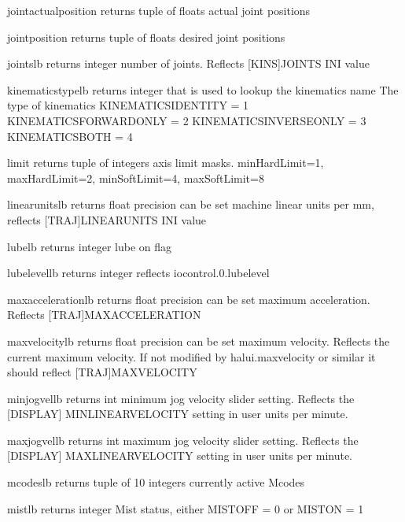 \documentclass[letterpaper,10pt,english]{sphinxmanual}
\begin{document}
\begin{sphinxVerbatim}[commandchars=\\\{\}]
joint\PYGZus{}actual\PYGZus{}position \PYGZhy{} returns tuple of floats
actual joint positions

joint\PYGZus{}position \PYGZhy{} returns tuple of floats
desired joint positions

joints\PYGZus{}lb \PYGZhy{} returns integer
number of joints. Reflects [KINS]JOINTS INI value

kinematics\PYGZus{}type\PYGZus{}lb \PYGZhy{} returns integer that is used to lookup the kinematics name
The type of kinematics
        KINEMATICS\PYGZus{}IDENTITY = 1
        KINEMATICS\PYGZus{}FORWARD\PYGZus{}ONLY = 2
        KINEMATICS\PYGZus{}INVERSE\PYGZus{}ONLY = 3
        KINEMATICS\PYGZus{}BOTH = 4

limit \PYGZhy{} returns tuple of integers
axis limit masks. minHardLimit=1, maxHardLimit=2, minSoftLimit=4, maxSoftLimit=8

linear\PYGZus{}units\PYGZus{}lb \PYGZhy{} returns float \PYGZhy{} precision can be set
machine linear units per mm, reflects [TRAJ]LINEAR\PYGZus{}UNITS INI value

lube\PYGZus{}lb \PYGZhy{} returns integer
lube on flag

lube\PYGZus{}level\PYGZus{}lb \PYGZhy{} returns integer
reflects iocontrol.0.lube\PYGZus{}level

max\PYGZus{}acceleration\PYGZus{}lb \PYGZhy{} returns float \PYGZhy{} precision can be set
maximum acceleration. Reflects [TRAJ]MAX\PYGZus{}ACCELERATION

max\PYGZus{}velocity\PYGZus{}lb \PYGZhy{} returns float \PYGZhy{} precision can be set
maximum velocity. Reflects the current maximum velocity. If not modified by
halui.max\PYGZhy{}velocity or similar it should reflect [TRAJ]MAX\PYGZus{}VELOCITY

min\PYGZus{}jog\PYGZus{}vel\PYGZus{}lb \PYGZhy{} returns int
minimum jog velocity slider setting. Reflects the [DISPLAY] MIN\PYGZus{}LINEAR\PYGZus{}VELOCITY
setting in user units per minute.

max\PYGZus{}jog\PYGZus{}vel\PYGZus{}lb \PYGZhy{} returns int
maximum jog velocity slider setting. Reflects the [DISPLAY] MAX\PYGZus{}LINEAR\PYGZus{}VELOCITY
setting in user units per minute.

mcodes\PYGZus{}lb \PYGZhy{} returns tuple of 10 integers
currently active M\PYGZhy{}codes

mist\PYGZus{}lb \PYGZhy{} returns integer
Mist status, either MIST\PYGZus{}OFF = 0 or MIST\PYGZus{}ON = 1


\end{sphinxVerbatim}
\end{document}

